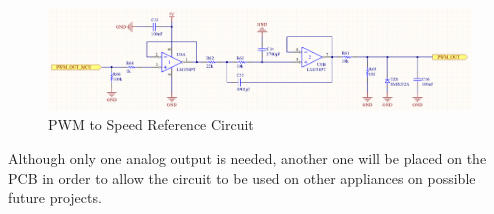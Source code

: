 	
		\begin{figure}[htbp]
			\centering
			\includegraphics[width=1\textwidth]{figuras/fig-pwmToSpeedReferenceCircuit}
			\caption{PWM to Speed Reference Circuit}
			\label{fig:pwmToSpeedReferenceCircuit}
		\end{figure}

		Although only one analog output is needed, another one will be placed on the PCB in order to allow the circuit to be used on other appliances on possible future projects.